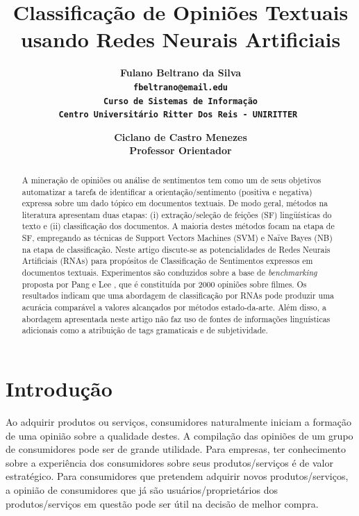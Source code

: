 \documentclass[11pt,a4paper]{article}
\begin{document}
\title{Classificação de Opiniões Textuais usando Redes Neurais Artificiais}

\author{ \bf Fulano Beltrano da Silva\\
		\tt fbeltrano@email.edu \\
		Curso de Sistemas de Informação \\
		Centro Universitário Ritter Dos Reis - UNIRITTER 
		\and
 		\bf Ciclano de Castro Menezes\\
		Professor Orientador\\
}

\maketitle
\thispagestyle{empty}

\begin{abstract}
   A mineração de opiniões ou análise de sentimentos tem como um de seus objetivos automatizar a tarefa de identificar a orientação/sentimento (positiva e negativa) expressa sobre um dado tópico em documentos textuais. De modo geral, métodos na literatura apresentam duas etapas: (i) extração/seleção de feições (SF) lingüísticas do texto e (ii) classificação dos documentos. A maioria destes métodos focam na etapa de SF, empregando as técnicas de Support Vectors Machines (SVM) e Naïve Bayes (NB) na etapa de classificação. Neste artigo discute-se as potencialidades de Redes Neurais Artificiais (RNAs) para propósitos de Classificação de Sentimentos expressos em documentos textuais. Experimentos são conduzidos sobre a base de \textit{benchmarking} proposta por Pang e Lee \cite{Pang04:Subjectivity}, que é constituída por 2000 opiniões sobre filmes. Os resultados indicam que uma abordagem de classificação por RNAs pode produzir uma acurácia comparável a valores alcançados por métodos estado-da-arte. Além disso, a abordagem apresentada neste artigo não faz uso de fontes de informações linguísticas adicionais como a atribuição de tags gramaticais e de subjetividade.
\end{abstract}

\section{Introdução}

Ao adquirir produtos ou serviços, consumidores naturalmente iniciam a formação de uma opinião sobre a qualidade destes. A compilação das opiniões de um grupo de consumidores pode ser de grande utilidade. Para empresas, ter conhecimento sobre a experiência dos consumidores sobre seus produtos/serviços é de valor estratégico. Para consumidores que pretendem adquirir novos produtos/serviços, a opinião de consumidores que já são usuários/proprietários dos produtos/serviços em questão pode ser útil na decisão de melhor compra.
\end{document}
